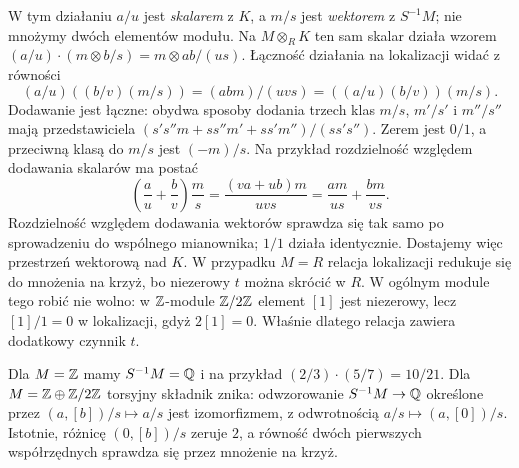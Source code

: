 W tym działaniu $a/u$ jest \emph{skalarem} z $K$, a $m/s$ jest
\emph{wektorem} z $S^{-1}M$; nie mnożymy dwóch elementów modułu.
Na $M\otimes_R K$ ten sam skalar działa wzorem
$(a/u)\cdot(m\otimes b/s)=m\otimes ab/(us)$.
Łączność działania na lokalizacji widać z równości
\[
 (a/u)((b/v)(m/s))=(abm)/(uvs)=((a/u)(b/v))(m/s).
\]
Dodawanie jest łączne: obydwa sposoby dodania trzech klas
$m/s$, $m'/s'$ i $m''/s''$ mają przedstawiciela
$(s's''m+ss''m'+ss'm'')/(ss's'')$.
Zerem jest $0/1$, a przeciwną klasą do $m/s$ jest $(-m)/s$.
Na przykład rozdzielność względem dodawania skalarów ma postać
\[
 \left(\frac au+\frac bv\right)\frac ms
 =\frac{(va+ub)m}{uvs}
 =\frac{am}{us}+\frac{bm}{vs}.
\]
Rozdzielność względem dodawania wektorów sprawdza się tak samo
po sprowadzeniu do wspólnego mianownika; $1/1$ działa
identycznie. Dostajemy więc przestrzeń wektorową nad $K$.
W przypadku $M=R$ relacja lokalizacji redukuje się do mnożenia
na krzyż, bo niezerowy $t$ można skrócić w $R$.
W ogólnym module tego robić nie wolno: w $\mathbb{Z}$-module $\mathbb{Z}/2\mathbb{Z}$
element $[1]$ jest niezerowy, lecz $[1]/1=0$ w lokalizacji,
gdyż $2[1]=0$. Właśnie dlatego relacja zawiera dodatkowy czynnik $t$.

\begin{przyklad}
Dla $M=\mathbb{Z}$ mamy $S^{-1}M=\mathbb{Q}$ i na przykład
$(2/3)\cdot(5/7)=10/21$.
Dla $M=\mathbb{Z}\oplus\mathbb{Z}/2\mathbb{Z}$ torsyjny składnik znika:
odwzorowanie $S^{-1}M\to\mathbb{Q}$ określone przez
$(a,[b])/s\mapsto a/s$
jest izomorfizmem, z odwrotnością $a/s\mapsto(a,[0])/s$.
Istotnie, różnicę $(0,[b])/s$ zeruje $2$, a równość dwóch
pierwszych współrzędnych sprawdza się przez mnożenie na krzyż.
\end{przyklad}

